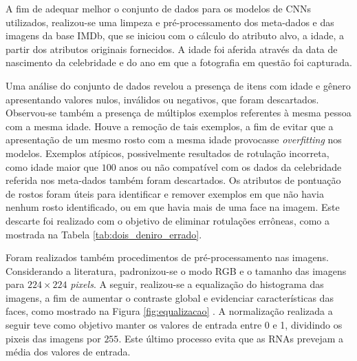 A fim de adequar melhor o conjunto de dados para os modelos de CNNs utilizados, realizou-se uma limpeza e pré-processamento dos meta-dados e das imagens da base IMDb, que se iniciou com o cálculo do atributo alvo, a idade, a partir dos atributos originais fornecidos. A idade foi aferida através da data de nascimento da celebridade e do ano em que a fotografia em questão foi capturada.

Uma análise do conjunto de dados revelou a presença de itens com idade e gênero apresentando valores nulos, inválidos ou negativos, que foram descartados. Observou-se também a presença de múltiplos exemplos referentes à mesma pessoa com a mesma idade. Houve a remoção de tais exemplos, a fim de evitar que a apresentação de um mesmo rosto com a mesma idade provocasse \emph{overfitting} nos modelos. Exemplos atípicos, possivelmente resultados de rotulação incorreta, como idade maior que $100$ anos ou não compatível com os dados da celebridade referida nos meta-dados também foram descartados. Os atributos de pontuação de rostos foram úteis para identificar e remover exemplos em que não havia nenhum rosto identificado, ou em que havia mais de uma face na imagem. Este descarte foi realizado com o objetivo de eliminar rotulações errôneas, como a mostrada na Tabela \ref{tab:dois_deniro_errado}.

Foram realizados também procedimentos de pré-processamento nas imagens. Considerando a literatura, padronizou-se o modo RGB e o tamanho das imagens para $224 \times 224$ \emph{pixels}. A seguir, realizou-se a equalização do histograma das imagens, a fim de aumentar o contraste global e evidenciar características das faces, como mostrado na Figura \ref{fig:equalizacao} \cite{acharya2005image}. A normalização realizada a seguir teve como objetivo manter os valores de entrada entre 0 e 1, dividindo os pixeis das imagens por $255$. Este último processo evita que as RNAs prevejam a média dos valores de entrada.

